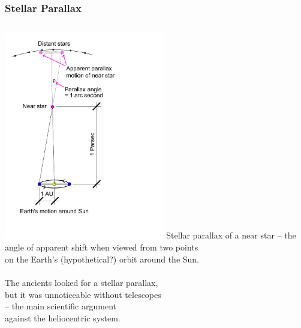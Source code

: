 \documentclass[aspectratio=169,xcolor=pdftex,dvipsnames]{beamer} %
\begin{document}
\begin{frame}
\frametitle{Stellar Parallax}

\begin{columns}
        
      \includegraphics[width=70mm]{parallax.pdf}
Stellar parallax of a near star --
the angle of apparent shift when viewed from two points\\ on the Earth's (hypothetical?) orbit around the Sun.
\\ \ \\
 The ancients looked for a stellar parallax,\\
 but it was unnoticeable without telescopes\\
 -- the main scientific argument\\
  against the heliocentric system.
 
  \end{columns} 

\end{frame}

\end{document}
